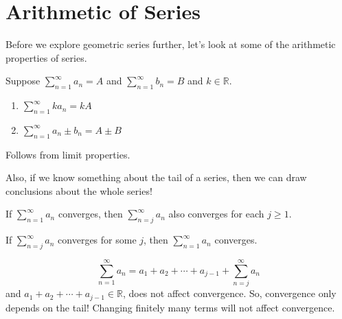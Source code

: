 \section{Arithmetic of Series}
Before we explore geometric series further, let's look at some
of the arithmetic properties of series.

\begin{Theorem}{}{}
    Suppose $ \sum\limits_{n=1}^{\infty} a_n=A $ and $ \sum\limits_{n=1}^{\infty} b_n=B $
    and $ k\in\mathbb{R} $.
    \begin{enumerate}
        \item $ \sum\limits_{n=1}^{\infty} ka_n=kA $
        \item $ \sum\limits_{n=1}^{\infty} a_n\pm b_n=A\pm B $
    \end{enumerate}
\end{Theorem}

\begin{Proof}{}{}
    Follows from limit properties.
\end{Proof}

Also, if we know something about the tail of a series, then we can draw conclusions about
the whole series!

\begin{Theorem}{}{}
    If $ \sum\limits_{n=1}^{\infty} a_n $ converges, then $ \sum\limits_{n=j}^{\infty} a_n $
    also converges for each $ j\geqslant 1 $.

    If $ \sum\limits_{n=j}^{\infty} a_n $ converges for some $ j $,
    then $ \sum\limits_{n=1}^{\infty} a_n $ converges.
\end{Theorem}

\begin{Proof}{}{}
    \[ \sum\limits_{n=1}^{\infty} a_n=a_1+a_2+\cdots+a_{j-1}+\sum\limits_{n=j}^{\infty} a_n \]
    and $ a_1+a_2+\cdots+a_{j-1}\in\mathbb{R} $, does not affect convergence.
    So, convergence only depends on the tail! Changing finitely many terms will not
    affect convergence.
\end{Proof}

